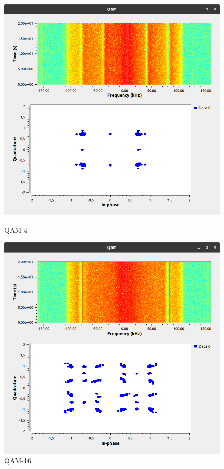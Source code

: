 \begin{figure}[!htb]
	\includegraphics[width=\linewidth]{pics/QAM-4}
	\caption{QAM-4}\label{fig:QAM-4}
	\endminipage\hfill
	\includegraphics[width=\linewidth]{pics/QAM-16}
	\caption{QAM-16}\label{fig:QAM-16}
	\endminipage\hfill
\end{figure}

